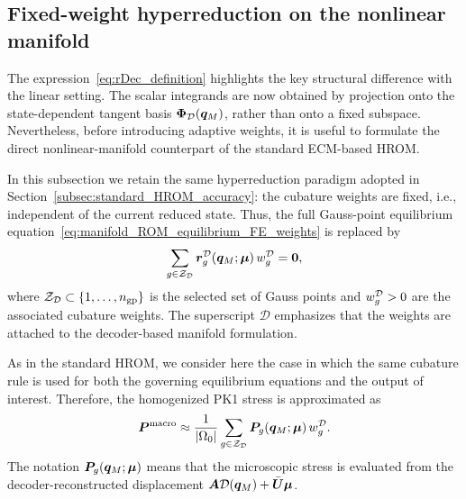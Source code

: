 \documentclass[11pt,a4paper]{article}
\begin{document}
\subsection{Fixed-weight hyperreduction on the nonlinear manifold}
\label{subsec:fixed_weight_manifold_hrom}

The expression~\eqref{eq:rDec_definition} highlights the key structural
difference with the linear setting. The scalar integrands are now obtained by
projection onto the state-dependent tangent basis $\bm{\Phi}_{\mathcal{D}}(\bm{q}_M)$, rather than
onto a fixed subspace. Nevertheless, before introducing adaptive weights, it is
useful to formulate the direct nonlinear-manifold counterpart of the standard
ECM-based HROM.

In this subsection we retain the same hyperreduction paradigm adopted in
Section~\ref{subsec:standard_HROM_accuracy}: the cubature weights are fixed,
i.e., independent of the current reduced state. Thus, the full Gauss-point
equilibrium equation~\eqref{eq:manifold_ROM_equilibrium_FE_weights} is replaced
by
\begin{equation}
\label{eq:manifold_fixed_ECM_equilibrium}
    \sum_{g\in\mathcal{Z}_{\mathcal{D}}}
    \bm{r}^{\mathcal{D}}_{g}(\bm{q}_M;\bm{\mu})\,w^{\mathcal{D}}_{g}
    =
    \bm{0},
\end{equation}
where $\mathcal{Z}_{\mathcal{D}}\subset\{1,\ldots,n_{\mathrm{gp}}\}$ is the selected set of Gauss points and
$w^{\mathcal{D}}_{g}>0$ are the associated cubature weights. The superscript
$\mathcal{D}$ emphasizes that the weights are attached to the decoder-based
manifold formulation.

As in the standard HROM, we consider here the case in which the same cubature
rule is used for both the governing equilibrium equations and the output of
interest. Therefore, the homogenized PK1 stress is approximated as
\begin{equation}
\label{eq:PKmacro_manifold_fixed_rule}
    \bm{P}^{\mathrm{macro}}
    \approx
    \frac{1}{|\Omega_0|}
    \sum_{g\in\mathcal{Z}_{\mathcal{D}}}
    \boldsymbol{P}_g(\bm{q}_M;\bm{\mu})\,w^{\mathcal{D}}_{g}.
\end{equation}
The notation $\boldsymbol{P}_g(\bm{q}_M;\bm{\mu})$ means that the microscopic stress is
evaluated from the decoder-reconstructed displacement
$\bm{A}\mathcal{\boldsymbol{D}}(\bm{q}_M)+\bar{\bm{U}}\bm{\mu}$.
\end{document}
